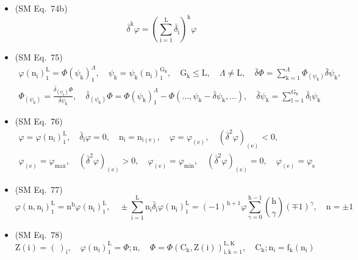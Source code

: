 \documentclass[12pt]{article}
\begin{document}
\begin{itemize}[label={},leftmargin=0pt]
    \item (SM Eq.\ 74b) 
    \[
    \bar{\delta}^\mathrm{k} \varphi = \left( \sum_{\mathrm{i}=1}^\mathrm{L} \bar{\delta}_\mathrm{i} \right)^\mathrm{k} \varphi
    \]

    \item (SM Eq.\ 75) 
    \[
    \begin{gathered}
    \varphi(\mathrm{n_i})_1^\mathrm{L} = \Phi(\psi_\mathrm{k})_1^\Lambda, \quad \psi_\mathrm{k} = \psi_\mathrm{k}(\mathrm{n_i})_1^{\mathrm{G_k}}, \quad \mathrm{G_k} \le \mathrm{L}, \quad \Lambda \ne \mathrm{L}, \quad \bar{\delta}\Phi = \sum_{\mathrm{k}=1}^\Lambda \Phi_{(\psi_\mathrm{k})} \bar{\delta}\psi_\mathrm{k}, \\
    \Phi_{(\psi_\mathrm{k})} = \frac{\bar{\delta}_{(\psi_\mathrm{k})}\Phi}{\bar{\delta}\psi_\mathrm{k}}, \quad \bar{\delta}_{(\psi_\mathrm{k})}\Phi = \Phi(\psi_\mathrm{k})_1^\Lambda - \Phi(\dots, \psi_\mathrm{k} - \bar{\delta}\psi_\mathrm{k}, \dots), \quad \bar{\delta}\psi_\mathrm{k} = \sum_{\mathrm{l}=1}^{\mathrm{G_k}} \bar{\delta}_\mathrm{l} \psi_\mathrm{k}
    \end{gathered}
    \]

    \item (SM Eq.\ 76) 
    \[
    \begin{gathered}
    \varphi = \varphi(\mathrm{n_i})_1^\mathrm{L}, \quad \bar{\delta}_\mathrm{i} \varphi = 0, \quad \mathrm{n_i} = \mathrm{n}_{\mathrm{i(e)}}, \quad \varphi = \varphi_{\mathrm{(e)}}, \quad (\bar{\delta}^2\varphi)_{\mathrm{(e)}} < 0, \\
    \varphi_{\mathrm{(e)}} = \varphi_{\max}, \quad (\bar{\delta}^2\varphi)_{\mathrm{(e)}} > 0, \quad \varphi_{\mathrm{(e)}} = \varphi_{\min}, \quad (\bar{\delta}^2\varphi)_{\mathrm{(e)}} = 0, \quad \varphi_{\mathrm{(e)}} = \varphi_\mathrm{s}
    \end{gathered}
    \]

    \item (SM Eq.\ 77) 
    \[
    \varphi(\mathrm{n}, \mathrm{n_i})_1^\mathrm{L} = \mathrm{n^h} \varphi(\mathrm{n_i})_1^\mathrm{L}, \quad \pm\sum_{\mathrm{i}=1}^\mathrm{L} \mathrm{n_i} \bar{\delta}_\mathrm{i} \varphi(\mathrm{n_i})_1^\mathrm{L} = (-1)^{\mathrm{h}+1} \varphi \sum_{\gamma=0}^{\mathrm{h}-1} \binom{\mathrm{h}}{\gamma} (\mp 1)^\gamma, \quad \mathrm{n} = \pm 1
    \]

    \item (SM Eq.\ 78) 
    \[
    \mathrm{Z}(\mathrm{i}) = (\ )_\mathrm{i}, \quad \varphi(\mathrm{n_i})_1^\mathrm{L} = \Phi;\mathrm{n}, \quad \Phi = \Phi(\mathrm{C_k}, \mathrm{Z}(\mathrm{i}))_{\mathrm{i,k}=1}^{\mathrm{L,K}}, \quad \mathrm{C_k};\mathrm{n_i} = \mathrm{f_k}(\mathrm{n_i})
    \]


\end{itemize}
\end{document}
